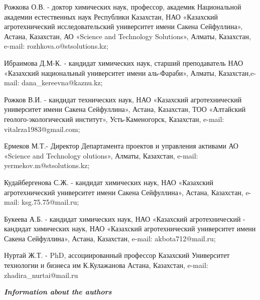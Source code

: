 \begin{noparindent}
Рожкова О.В. - доктор химических наук, профессор, академик Национальной
академии естественных наук Республики Казахстан, НАО «Казахский
агротехнический исследовательский университет имени Сакена Сейфуллина»,
Астана, Казахстан, АО «Science and Technology Solutions», Алматы,
Казахстан, e-mail: rozhkova.o@stsolutions.kz;

Ибраимова Д.М-К. - кандидат химических наук, старший преподаватель НАО
«Казахский национальный университет имени аль-Фараби», Алматы,
Казахстан,e-mail: dana\_kereevna@kaznu.kz;

Рожков В.И. - кандидат технических наук, НАО «Казахский агротехнический
университет имени Сакена Сейфуллина», Астана, Казахстан, ТОО «Алтайский
геолого-экологический институт», Усть-Каменогорск, Казахстан, e-mail:
vitalrza1983@gmail.com;

Ермеков М.Т.- Директор Департамента проектов и управления активами АО
«Science and Technology olutions», Алматы, Казахстан, e-mail:
yermekov.m@stsolutions.kz;

Кудайбергенова С.Ж. - кандидат химических наук, НАО «Казахский
агротехнический университет имени Сакена Сейфуллина», Астана, Казахстан,
e-mail: ksg.75.75@mail.ru;

Букеева А.Б. - кандидат химических наук, НАО «Казахский агротехнический
- кандидат химических наук, НАО «Казахский агротехнический университет
имени Сакена Сейфуллина», Астана, Казахстан, e-mail: akbota712@mail.ru;

Нуртай Ж.Т. - PhD, ассоциированный профессор Казахский Университет
технологии и бизнеса им К.Кулажанова Астана, Казахстан, e-mail:
zhadira\_nurtai@mail.ru
\end{noparindent}

\emph{{\bfseries Information about the authors}}


